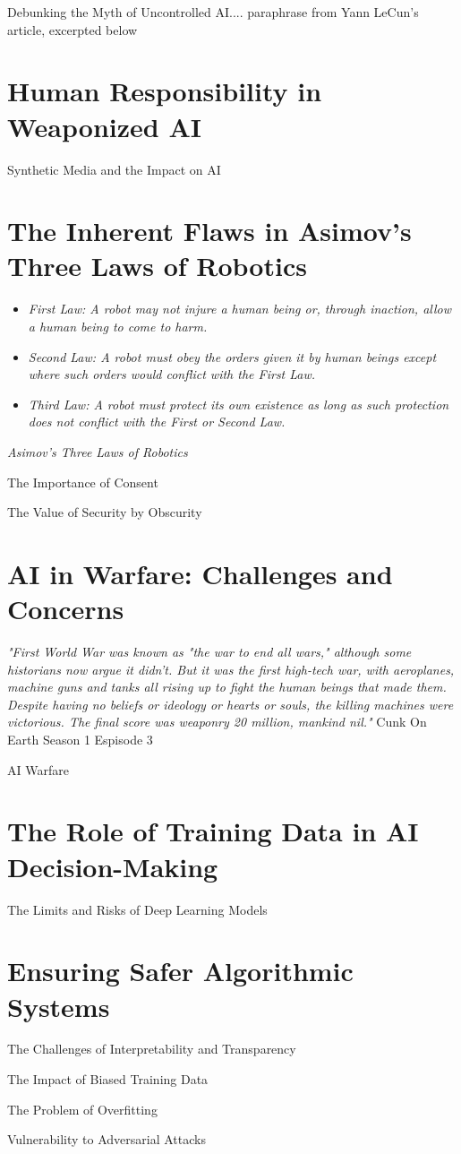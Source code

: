 Debunking the Myth of Uncontrolled AI.... paraphrase from Yann LeCun's article, excerpted below



\section{Human Responsibility in Weaponized AI}

Synthetic Media and the Impact on AI \cite{syntheticmedia}

\section{The Inherent Flaws in Asimov's Three Laws of Robotics}

\begin{itemize}
    \item\textit{First Law: A robot may not injure a human being or, through inaction, allow a human being to come to harm.}
    \item\textit{Second Law: A robot must obey the orders given it by human beings except where such orders would conflict with the First Law.}
    \item\textit{Third Law: A robot must protect its own existence as long as such protection does not conflict with the First or Second Law.}
\end{itemize} 
\textit{Asimov's Three Laws of Robotics}

The Importance of Consent

The Value of Security by Obscurity

\section{AI in Warfare: Challenges and Concerns}

\textit{"First World War was known as "the war to end all wars," although some historians now argue it didn't. But it was the first high-tech war, with aeroplanes, machine guns and tanks all rising up to fight the human beings that made them. Despite having no beliefs or ideology or hearts or souls, the killing machines were victorious. The final score was weaponry 20 million, mankind nil."} Cunk On Earth Season 1 Espisode 3 \cite{cunkonearth}

AI Warfare \cite{aiwarfare}

\section{The Role of Training Data in AI Decision-Making}

The Limits and Risks of Deep Learning Models

\section{Ensuring Safer Algorithmic Systems}

\cite{saferalgorithmicsystems}

The Challenges of Interpretability and Transparency

The Impact of Biased Training Data

The Problem of Overfitting

Vulnerability to Adversarial Attacks

